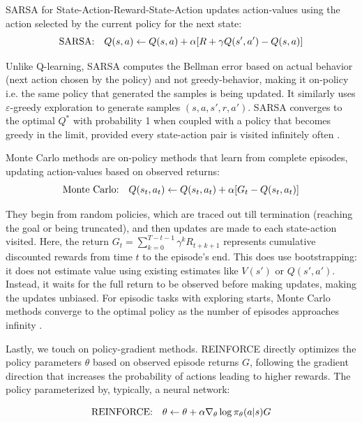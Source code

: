 SARSA for State-Action-Reward-State-Action updates action-values using the action selected by the current policy for the next state:
\begin{equation}
\text{SARSA:\quad} Q(s,a) \leftarrow Q(s,a) + \alpha [R + \gamma Q(s',a') - Q(s,a)]
\end{equation}

Unlike Q-learning, SARSA computes the Bellman error based on actual behavior (next action chosen by the policy) and not greedy-behavior, making it on-policy i.e. the same policy that generated the samples is being updated. It similarly uses $\varepsilon$-greedy exploration to generate samples $(s,a,s',r,a')$. SARSA converges to the optimal $Q^*$ with probability 1 when coupled with a policy that becomes greedy in the limit, provided every state-action pair is visited infinitely often \cite{singh2000}.


Monte Carlo methods are on-policy methods that learn from complete episodes, updating action-values based on observed returns:
\begin{equation}
\text{Monte Carlo:\quad} Q(s_t,a_t) \leftarrow Q(s_t,a_t) + \alpha[G_t - Q(s_t,a_t)]
\end{equation}

They begin from random policies, which are traced out till termination (reaching the goal or being truncated), and then updates are made to each state-action visited. Here, the return $G_t = \sum_{k=0}^{T-t-1} \gamma^k R_{t+k+1}$ represents cumulative discounted rewards from time $t$ to the episode's end. This does use bootstrapping: it does not estimate value using existing estimates like $V(s')$ or $Q(s',a')$. Instead, it waits for the full return to be observed before making updates, making the updates unbiased. For episodic tasks with exploring starts, Monte Carlo methods converge to the optimal policy as the number of episodes approaches infinity \cite{tsitsiklis2002}.

Lastly, we touch on policy-gradient methods. REINFORCE directly optimizes the policy parameters $\theta$ based on observed episode returns $G$, following the gradient direction that increases the probability of actions leading to higher rewards. The policy parameterized by, typically, a neural network:

\begin{equation}
\text{REINFORCE:\quad} \theta \leftarrow \theta + \alpha \nabla_\theta \log \pi_\theta(a|s) G
\end{equation}

